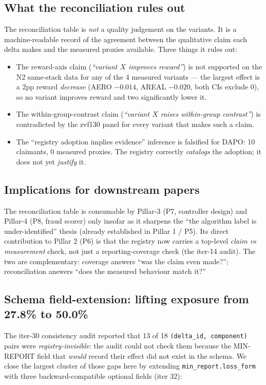 \documentclass{article}
\begin{document}
\subsection{What the reconciliation rules out}
The reconciliation table is \emph{not} a quality judgement on the
variants. It is a machine-readable record of the agreement between the
qualitative claim each delta makes and the measured proxies available.
Three things it rules out:

\begin{itemize}
  \item The reward-axis claim (\emph{``variant $X$ improves reward''})
    is not supported on the N2 same-stack data for any of the 4
    measured variants --- the largest effect is a $2$pp reward
    \emph{decrease} (AERO $-0.014$, AREAL $-0.020$, both CIs exclude 0),
    so no variant improves reward and two significantly lower it.
  \item The within-group-contrast claim (\emph{``variant $X$ raises
    within-group contrast''}) is contradicted by the zvf130 panel for
    every variant that makes such a claim.
  \item The ``registry adoption implies evidence'' inference is
    falsified for DAPO: 10 claimants, 0 measured proxies. The registry
    correctly \emph{catalogs} the adoption; it does not yet
    \emph{justify} it.
\end{itemize}

\subsection{Implications for downstream papers}
The reconciliation table is consumable by Pillar-3 (P7, controller
design) and Pillar-4 (P8, fraud scorer) only insofar as it sharpens
the ``the algorithm label is under-identified'' thesis (already
established in Pillar 1 / P5). Its direct contribution to Pillar 2
(P6) is that the registry now carries a top-level \emph{claim vs
measurement} check, not just a reporting-coverage check (the iter-14
audit). The two are complementary: coverage answers ``was the claim
even made?''; reconciliation answers ``does the measured behaviour
match it?'' \subsection{Schema field-extension: lifting exposure from 27.8\% to 50.0\%}
\label{sec:p6-schema-extension}

The iter-30 consistency audit reported that 13 of 18
\texttt{(delta\_id, component)} pairs were \emph{registry-invisible}:
the audit could not check them because the MIN-REPORT field that
\emph{would} record their effect did not exist in the schema. We close
the largest cluster of those gaps here by extending
\texttt{min\_report.loss\_form} with three backward-compatible optional
fields (iter 32):
\end{document}
